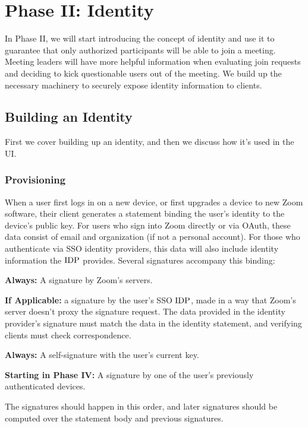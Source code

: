 \section{Phase II: Identity}

In Phase II, we will start introducing the concept of identity and use it to guarantee that only authorized participants will be able to join a meeting. Meeting leaders will have more helpful information when evaluating join requests and deciding to kick questionable users out of the meeting. We build up the necessary machinery to securely expose identity information to clients.

\subsection{Building an Identity}

First we cover building up an identity, and then we discuss how it's used in the UI.

\subsubsection{Provisioning}

When a user first logs in on a new device, or first upgrades a device to new Zoom software, their client generates a statement binding the user's identity to the device's public key. For users who sign into Zoom directly or via OAuth, these data consist of email and organization (if not a personal account). For those who authenticate via SSO identity providers, this data will also include identity information the $\mathrm{IDP}$ provides. Several signatures accompany this binding:

\begin{enumerate*}
	\item {\bf Always:} A signature by Zoom's servers.
	\item {\bf If Applicable:} a signature by the user's SSO $\mathrm{IDP}$, made in a way that Zoom's server doesn't proxy the signature request. The data provided in the identity provider's signature must match the data in the identity statement, and verifying clients must check correspondence.
	\item {\bf Always:} A self-signature with the user's current key.
	\item {\bf Starting in Phase IV:} A signature by one of the user's previously authenticated devices.
\end{enumerate*}

The signatures should happen in this order, and later signatures should be computed over the statement body and previous signatures.

